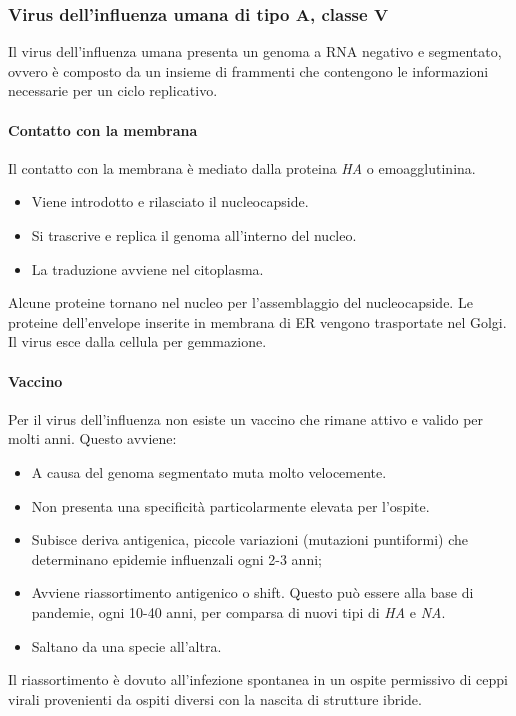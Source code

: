 		\subsubsection{Virus dell'influenza umana di tipo A, classe $\mathbf{V}$}
		Il virus dell'influenza umana presenta un genoma a RNA negativo e segmentato, ovvero \`e composto da un insieme di frammenti che contengono le informazioni necessarie per un ciclo replicativo.
		
			\paragraph{Contatto con la membrana}
			Il contatto con la membrana \`e mediato dalla proteina \emph{HA} o emoagglutinina.
			\begin{multicols}{2}
				\begin{itemize}
					\item Viene introdotto e rilasciato il nucleocapside.
					\item Si trascrive e replica il genoma all'interno del nucleo.
					\item La traduzione avviene nel citoplasma.
				\end{itemize}
			\end{multicols}
			Alcune proteine tornano nel nucleo per l'assemblaggio del nucleocapside.
			Le proteine dell'envelope inserite in membrana di ER vengono trasportate nel Golgi.
			Il virus esce dalla cellula per gemmazione.

			\paragraph{Vaccino}
			Per il virus dell'influenza non esiste un vaccino che rimane attivo e valido per molti anni. 
			Questo avviene:
			\begin{multicols}{2}
				\begin{itemize}
    					\item A causa del genoma segmentato muta molto velocemente.
    					\item Non presenta una specificit\`a particolarmente elevata per l'ospite.
    					\item Subisce deriva antigenica, piccole variazioni (mutazioni puntiformi) che determinano epidemie influenzali ogni 2-3 anni; 
    					\item Avviene riassortimento antigenico o shift. 
						Questo pu\`o essere alla base di pandemie, ogni 10-40 anni, per comparsa di nuovi tipi di \emph{HA} e \emph{NA}. 
					\item Saltano da una specie all'altra.
				\end{itemize}
			\end{multicols}
			Il riassortimento \`e dovuto all'infezione spontanea in un ospite permissivo di ceppi virali provenienti da ospiti diversi con la nascita di strutture ibride.

